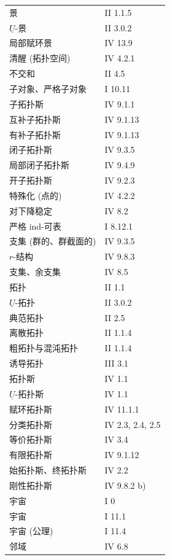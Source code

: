 \begin{longtable}{@{}p{.68\linewidth}p{.27\linewidth}@{}}
景 & II 1.1.5\\
$\underline U$-景 & II 3.0.2\\
局部赋环景 & IV 13.9\\
清醒 (拓扑空间) & IV 4.2.1\\
不交和 & II 4.5\\
子对象、严格子对象 & I 10.11\\
子拓扑斯 & IV 9.1.1\\
互补子拓扑斯 & IV 9.1.13\\
有补子拓扑斯 & IV 9.1.13\\
闭子拓扑斯 & IV 9.3.5\\
局部闭子拓扑斯 & IV 9.4.9\\
开子拓扑斯 & IV 9.2.3\\
特殊化 (点的) & IV 4.2.2\\
对下降稳定 & IV 8.2\\
严格 ind-可表 & I 8.12.1\\
支集 (群的、群截面的) & IV 9.3.5\\
$r$-结构 & IV 9.8.3\\
支集、余支集 & IV 8.5\\[.7em]
拓扑 & II 1.1\\
$\underline U$-拓扑 & II 3.0.2\\
典范拓扑 & II 2.5\\
离散拓扑 & II 1.1.4\\
粗拓扑与混沌拓扑 & II 1.1.4\\
诱导拓扑 & III 3.1\\
拓扑斯 & IV 1.1\\
$\underline U$-拓扑斯 & IV 1.1\\
赋环拓扑斯 & IV 11.1.1\\
分类拓扑斯 & IV 2.3, 2.4, 2.5\\
等价拓扑斯 & IV 3.4\\
有限拓扑斯 & IV 9.1.12\\
始拓扑斯、终拓扑斯 & IV 2.2\\
刚性拓扑斯 & IV 9.8.2 b)\\[.7em]
宇宙 & I 0\\
宇宙 & I 11.1\\
宇宙 (公理) & I 11.4\\[.7em]
邻域 & IV 6.8\\
\end{longtable}
\endgroup

